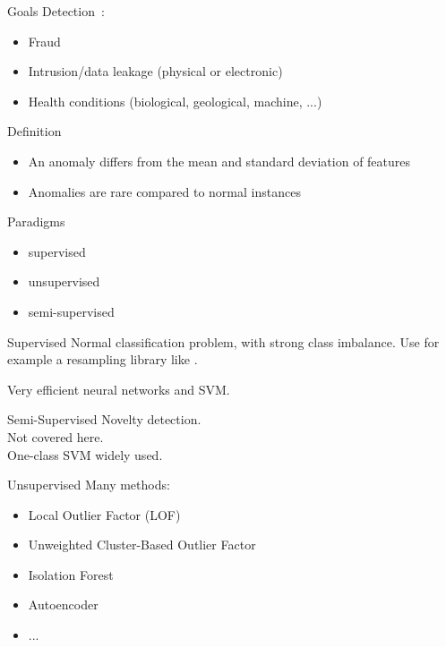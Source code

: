 \begin{frame}{Goals}
  Detection~:
  \begin{itemize}
  \item Fraud
  \item Intrusion/data leakage (physical or electronic)
  \item Health conditions (biological, geological, machine, ...)
  \end{itemize}
\end{frame}

\begin{frame}{Definition}
  \begin{itemize}
  \item An anomaly differs from the mean and standard deviation of features
  \item Anomalies are rare compared to normal instances
  \end{itemize}
\end{frame}

\begin{frame}{Paradigms}
  \begin{itemize}
    \item supervised
    \item unsupervised
    \item semi-supervised
  \end{itemize}
\end{frame}

\begin{frame}{Supervised}
  Normal classification problem, with strong class imbalance.
  Use for example a resampling library like .

  Very efficient neural networks and SVM.
\end{frame}

\begin{frame}{Semi-Supervised}
  Novelty detection. \\
  Not covered here. \\
  One-class SVM widely used.
\end{frame}

\begin{frame}{Unsupervised}
  Many methods: 
  \begin{itemize}
  \item Local Outlier Factor (LOF)
  \item Unweighted Cluster-Based Outlier Factor
  \item Isolation Forest
  \item Autoencoder
  \item ...
  \end{itemize}
\end{frame}


